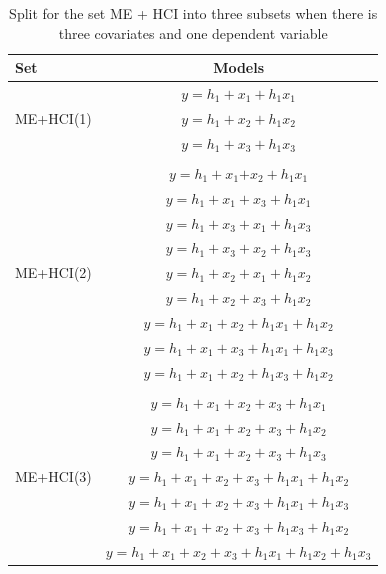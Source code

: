 \begin{table}[hbt!]
\caption{Split for the set ME + HCI into three subsets when there is three covariates and one dependent variable}
\centering
\begin{tabular}{lc}  
\toprule
Set & Models \\
\midrule
\multirow{3}{*}{ME+HCI(1)} & $y=h_1+x_1+h_1x_1$\\ & $y=h_1+x_2+h_1x_2$\\ & $y=h_1+x_3+h_1x_3$\\ & \\ 
\multirow{9}{*}{ME+HCI(2)} & $y=h_1+x_1$$+x_2+h_1x_1$\\ & $y=h_1+x_1+x_3+h_1x_1$\\ & $y=h_1+x_3+x_1+h_1x_3$\\ & $y=h_1+x_3+x_2+h_1x_3$\\ & $y=h_1+x_2+x_1+h_1x_2$\\ & $y=h_1+x_2+x_3+h_1x_2$\\ & $y=h_1+x_1+x_2+h_1x_1+h_1x_2$\\ & $y=h_1+x_1+x_3+h_1x_1+h_1x_3$\\ & $y=h_1+x_1+x_2+h_1x_3+h_1x_2$\\  & \\  
\multirow{7}{*}{ME+HCI(3)} & $y=h_1+x_1+x_2+x_3+h_1x_1$\\ & $y=h_1+x_1+x_2+x_3+h_1x_2$\\ & $y=h_1+x_1+x_2+x_3+h_1x_3$\\ & $y=h_1+x_1+x_2+x_3+h_1x_1+h_1x_2$\\ & $y=h_1+x_1+x_2+x_3+h_1x_1+h_1x_3$\\ & $y=h_1+x_1+x_2+x_3+h_1x_3+h_1x_2$\\ & $y=h_1+x_1+x_2+x_3+h_1x_1+h_1x_2+h_1x_3$\\  
\bottomrule
\end{tabular}
\end{table}

